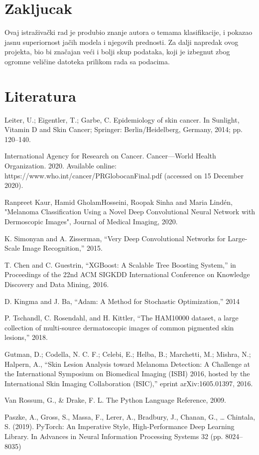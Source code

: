 \documentclass{article}
\begin{document}
\section{Zakljucak}
Ovaj istraživački rad je produbio znanje autora o temama klasifikacije, i pokazao jasnu superiornost jačih modela i njegovih prednosti. Za dalji napredak ovog projekta, bio bi značajan veći i bolji skup podataka, koji je izbegnut zbog ogromne veličine datoteka prilikom rada sa podacima.

\section{Literatura}

\begin{enumerate}[label={[\arabic*]}]
  \item Leiter, U.; Eigentler, T.; Garbe, C. Epidemiology of skin cancer. In Sunlight, Vitamin D and Skin Cancer; Springer: Berlin/Heidelberg, Germany, 2014; pp. 120–140.
  \item International Agency for Research on Cancer. Cancer—World Health Organization. 2020. Available online: https://www.who.int/cancer/PRGlobocanFinal.pdf (accessed on 15 December 2020).
  \item Ranpreet Kaur, Hamid GholamHosseini, Roopak Sinha and Maria Lindén, "Melanoma Classification Using a Novel Deep Convolutional Neural Network with Dermoscopic Images", Journal of Medical Imaging, 2020.
  \item K. Simonyan and A. Zisserman, “Very Deep Convolutional Networks for Large-Scale Image Recognition,” 2015. %
  \item T. Chen and C. Guestrin, “XGBoost: A Scalable Tree Boosting System,” in Proceedings of the 22nd ACM SIGKDD International Conference on Knowledge Discovery and Data Mining, 2016. %
  \item D. Kingma and J. Ba, “Adam: A Method for Stochastic Optimization,” 2014 
  \item P. Tschandl, C. Rosendahl, and H. Kittler, “The HAM10000 dataset, a large collection of multi-source dermatoscopic images of common pigmented skin lesions,” 2018.
  \item Gutman, D.; Codella, N. C. F.; Celebi, E.; Helba, B.; Marchetti, M.; Mishra, N.; Halpern, A., “Skin Lesion Analysis toward Melanoma Detection: A Challenge at the International Symposium on Biomedical Imaging (ISBI) 2016, hosted by the International Skin Imaging Collaboration (ISIC),” eprint arXiv:1605.01397, 2016.
  \item Van Rossum, G., \& Drake, F. L. The Python Language Reference, 2009.
  \item Paszke, A., Gross, S., Massa, F., Lerer, A., Bradbury, J., Chanan, G., … Chintala, S. (2019). PyTorch: An Imperative Style, High-Performance Deep Learning Library. In Advances in Neural Information Processing Systems 32 (pp. 8024–8035)
\end{enumerate}
\end{document}
